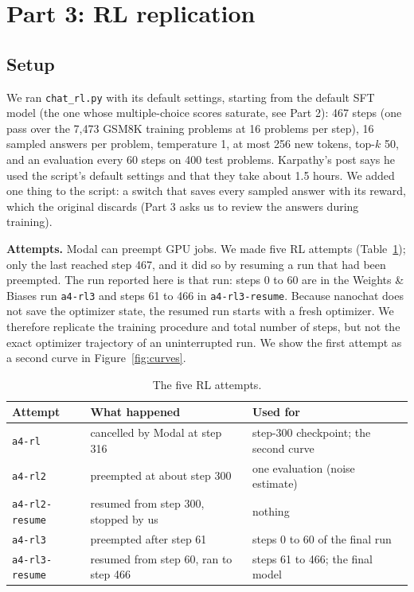 \documentclass[10pt]{article}
\newcommand{\code}[1]{\texttt{#1}}
\begin{document}
\section*{Part 3: RL replication}

\subsection*{Setup}
We ran \code{chat\_rl.py} with its default settings, starting from the default SFT model (the one whose multiple-choice scores saturate, see Part 2): 467 steps (one pass over the 7{,}473 GSM8K training problems at 16 problems per step), 16 sampled answers per problem, temperature 1, at most 256 new tokens, top-$k$ 50, and an evaluation every 60 steps on 400 test problems. Karpathy's post says he used the script's default settings and that they take about 1.5 hours. We added one thing to the script: a switch that saves every sampled answer with its reward, which the original discards (Part 3 asks us to review the answers during training).

\textbf{Attempts.} Modal can preempt GPU jobs. We made five RL attempts (Table~\ref{tab:attempts}); only the last reached step 467, and it did so by resuming a run that had been preempted. The run reported here is that run: steps 0 to 60 are in the Weights \& Biases run \code{a4-rl3} and steps 61 to 466 in \code{a4-rl3-resume}. Because nanochat does not save the optimizer state, the resumed run starts with a fresh optimizer. We therefore replicate the training procedure and total number of steps, but not the exact optimizer trajectory of an uninterrupted run. We show the first attempt as a second curve in Figure~\ref{fig:curves}.

\begin{table}[h]
\centering
\small
\begin{tabular}{lll}
\toprule
Attempt & What happened & Used for \\
\midrule
\code{a4-rl} & cancelled by Modal at step 316 & step-300 checkpoint; the second curve \\
\code{a4-rl2} & preempted at about step 300 & one evaluation (noise estimate) \\
\code{a4-rl2-resume} & resumed from step 300, stopped by us & nothing \\
\code{a4-rl3} & preempted after step 61 & steps 0 to 60 of the final run \\
\code{a4-rl3-resume} & resumed from step 60, ran to step 466 & steps 61 to 466; the final model \\
\bottomrule
\end{tabular}
\caption{The five RL attempts.}
\label{tab:attempts}
\end{table}
\end{document}
